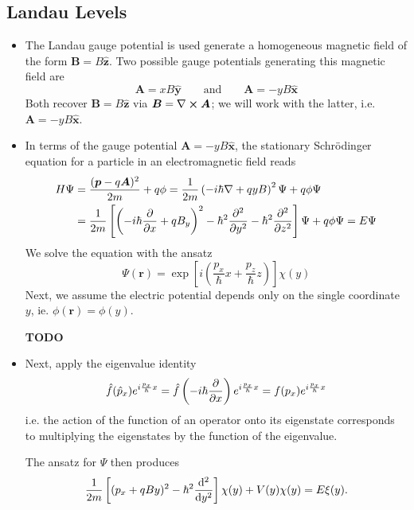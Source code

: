 \documentclass[11pt, a4paper]{article}
\renewcommand{\curl}{\nabla \cross}
\renewcommand{\grad}{\nabla}
\newcommand{\eqtext}[1]{\qquad \text{#1} \qquad}
\newcommand{\Schro}{Schr\"{o}dinger\xspace}
\renewcommand{\vec}[1]{\bm{#1}}  %
\newcommand{\uvec}[1]{\hat{\vec{#1}}}  %
\renewcommand{\r}{\vec{r}}  %
\newcommand{\A}{\vec{A}}  %
\newcommand{\B}{\vec{B}}  %
\renewcommand{\P}{\Psi}  %
\begin{document}
\subsection{Landau Levels}
\begin{itemize}
	\item The Landau gauge potential is used generate a homogeneous magnetic field of the form $ \B = B \uvec{z} $. Two possible gauge potentials generating this magnetic field are
	\begin{equation*}
		\A = x B \uvec{y} \eqtext{and} \A = - y B \uvec{x}
	\end{equation*}
	Both recover $ \B = B \uvec{z} $ via $ \B = \curl \A $; we will work with the latter, i.e. $ \A = - y B \uvec{x} $.
	
	\item In terms of the gauge potential $ \A = - y B \uvec{x} $, the stationary \Schro equation for a particle in an electromagnetic field reads
	\begin{align*}
		H\P &= \frac{(\vec{p} - q\A)^{2}}{2m} + q \phi = \frac{1}{2m} \left(-i\hbar \grad + qyB \right)^{2}\P + q \phi \P \\
		&  =\frac{1}{2m}\left[\left(-i\hbar \pdv{x} + qB_{y}\right)^{2} - \hbar^{2}\pdv[2]{}{y} - \hbar^{2}\pdv[2]{}{z}\right]\P + q\phi \P = E \P
	\end{align*}
	We solve the equation with the ansatz
	\begin{equation*}
		\P(\r) = \exp\left[i \left(\frac{p_{x}}{\hbar}x + \frac{p_{z}}{\hbar}z \right)\right]\chi(y)
	\end{equation*}
	Next, we assume the electric potential depends only on the single coordinate $ y $, ie. $ \phi(\r) = \phi(y) $. 
	
	\textbf{TODO}
	\item Next, apply the eigenvalue identity
	\begin{equation*}
		\hat{f}(\hat{p}_{x})e^{i\frac{p_{x}}{\hbar}x} = \hat{f}\left(-i\hbar \pdv{x}\right)e^{i\frac{p_{x}}{\hbar}x} = f(p_{x}) e^{i\frac{p_{x}}{\hbar}x} 
	\end{equation*}
	i.e. the action of the function of an operator onto its eigenstate corresponds to multiplying the eigenstates by the function of the eigenvalue.
	
	The ansatz for $ \P $ then produces
	\begin{equation*}
		\frac{1}{2m}\left[(p_{x} + qBy)^{2} - \hbar^{2}\dv[2]{}{y}\right]\chi(y) + V(y)\chi(y) = E\xi(y).
	\end{equation*}
	
	
\end{itemize}
\end{document}
